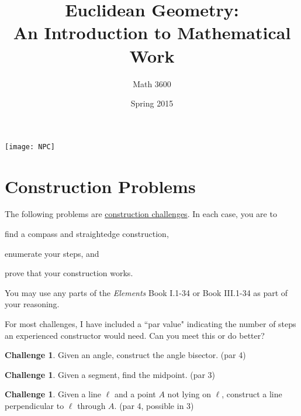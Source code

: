 \documentclass{tufte-handout}
\title{Euclidean Geometry:\\An Introduction to Mathematical Work}
\author[]{Math 3600}
\date{Spring 2015}
\theoremstyle{definition}
\newtheorem{challenge}[problem]{Challenge}
\begin{document}
\maketitle

\begin{marginfigure}
    \texttt{[image: NPC]}
\end{marginfigure}

\setcounter{section}{11}
\section{Construction Problems}

The following problems are \underline{construction challenges}. In each case, you are to
\begin{compactenum}
\item find a compass and straightedge construction,
\item enumerate your steps, and
\item prove that your construction works.
\end{compactenum}
You may use any parts of the \emph{Elements} Book I.1-34 or Book III.1-34 as part of your reasoning.



For most challenges, I have included a ``par value" indicating the number of steps an experienced constructor would need.
Can you meet this or do better?


\begin{challenge}\label{chal:angle-bisector}
Given an angle, construct the angle bisector. (par 4)
\end{challenge}

\begin{challenge}\label{chal:midpoint}
Given a segment, find the midpoint. (par 3)
\end{challenge}

\begin{challenge}\label{chal:perp-pt-not-on-line}
Given a line $\ell$ and a point $A$ not lying on $\ell$, construct a line perpendicular to $\ell$ through $A$. (par 4, possible in 3)
\end{challenge}
\end{document}
